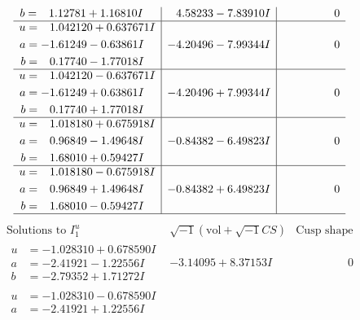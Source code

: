 \documentclass[1p]{elsarticle_modified}
\theoremstyle{definition}
\newcommand{\I}{\sqrt{-1}}
\begin{document}
$$\begin{array}{c|c|c}
\begin{aligned}
b &= \phantom{-}1.12781 + 1.16810 I\end{aligned}
 & \phantom{-}4.58233 - 7.83910 I & \phantom{-0.000000 } 0 \\ \hline\begin{aligned}
u &= \phantom{-}1.042120 + 0.637671 I \\
a &= -1.61249 - 0.63861 I \\
b &= \phantom{-}0.17740 - 1.77018 I\end{aligned}
 & -4.20496 - 7.99344 I & \phantom{-0.000000 } 0 \\ \hline\begin{aligned}
u &= \phantom{-}1.042120 - 0.637671 I \\
a &= -1.61249 + 0.63861 I \\
b &= \phantom{-}0.17740 + 1.77018 I\end{aligned}
 & -4.20496 + 7.99344 I & \phantom{-0.000000 } 0 \\ \hline\begin{aligned}
u &= \phantom{-}1.018180 + 0.675918 I \\
a &= \phantom{-}0.96849 - 1.49648 I \\
b &= \phantom{-}1.68010 + 0.59427 I\end{aligned}
 & -0.84382 - 6.49823 I & \phantom{-0.000000 } 0 \\ \hline\begin{aligned}
u &= \phantom{-}1.018180 - 0.675918 I \\
a &= \phantom{-}0.96849 + 1.49648 I \\
b &= \phantom{-}1.68010 - 0.59427 I\end{aligned}
 & -0.84382 + 6.49823 I & \phantom{-0.000000 } 0\\
 \hline 
 \end{array}$$\newpage$$\begin{array}{c|c|c}  
\text{Solutions to }I^u_{1}& \I (\text{vol} + \sqrt{-1}CS) & \text{Cusp shape}\\
 \hline 
\begin{aligned}
u &= -1.028310 + 0.678590 I \\
a &= -2.41921 - 1.22556 I \\
b &= -2.79352 + 1.71272 I\end{aligned}
 & -3.14095 + 8.37153 I & \phantom{-0.000000 } 0 \\ \hline\begin{aligned}
u &= -1.028310 - 0.678590 I \\
a &= -2.41921 + 1.22556 I \\

\end{aligned}
\end{array}$$
\end{document}
